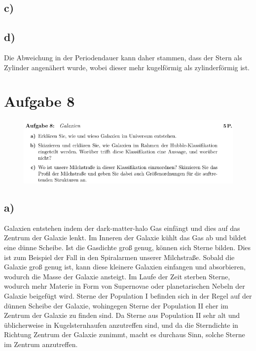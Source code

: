 \subsection{c)}



\subsection{d)}

Die Abweichung in der Periodendauer kann daher stammen, dass der Stern als 
Zylinder angenähert wurde, wobei dieser mehr kugelförmig als zylinderförmig ist.

\section{Aufgabe 8}

\begin{figure}[H]
    \centering
    \includegraphics[width=\textwidth]{images/Aufgabe8.jpg}
    \label{fig:3}
\end{figure}

\newpage
\subsection{a)}

    \justifying Galaxien entstehen indem der dark-matter-halo Gas einfängt und dies auf das Zentrum der Galaxie lenkt. Im
    Inneren der Galaxie kühlt das Gas ab und bildet eine dünne Scheibe. Ist die Gasdichte groß genug, können sich Sterne bilden. Dies ist zum 
    Beispiel der Fall in den Spiralarmen unserer Milchstraße. Sobald die Galaxie groß genug ist, kann diese kleinere Galaxien einfangen und
    absorbieren, wodurch die Masse der Galaxie ansteigt. Im Laufe der Zeit sterben Sterne, wodurch mehr Materie in Form von Supernovae oder 
    planetarischen Nebeln der Galaxie beigefügt wird. Sterne der Population I befinden sich in der Regel auf der dünnen Scheibe der Galaxie, 
    wohingegen Sterne der Population II eher im Zentrum der Galaxie zu finden sind. Da Sterne aus Population II sehr alt und üblicherweise 
    in Kugelsternhaufen anzutreffen sind, und da die Sterndichte in Richtung Zentrum der Galaxie zunimmt, macht es durchaus Sinn, solche Sterne
    im Zentrum anzutreffen. 

